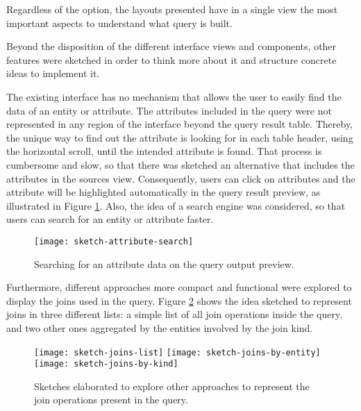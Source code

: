 Regardless of the option, the layouts presented have in a single view the most important aspects to understand what query is built.

Beyond the disposition of the different interface views and components, other features were sketched in order to think more about it and structure concrete ideas to implement it.

The existing interface has no mechanism that allows the user to easily find the data of an entity or attribute. The attributes included in the query were not represented in any region of the interface beyond the query result table. Thereby, the unique way to find out the attribute is looking for in each table header, using the horizontal scroll, until the intended attribute is found. That process is cumbersome and slow, so that there was sketched an alternative that includes the attributes in the sources view. Consequently, users can click on attributes and the attribute will be highlighted automatically in the query result preview, as illustrated in Figure \ref{fig:sketchAttributeSearch}. Also, the idea of a search engine was considered, so that users can search for an entity or attribute faster.

\begin{figure}[htbp]
	\centering
	\texttt{[image: sketch-attribute-search]}
	\caption{Searching for an attribute data on the query output preview.}
	\label{fig:sketchAttributeSearch}
\end{figure}

Furthermore, different approaches more compact and functional were explored to display the joins used in the query. Figure \ref{fig:sketchJoins} shows the idea sketched to represent joins in three different lists: a simple list of all join operations inside the query, and two other ones aggregated by the entities involved by the join kind.

\begin{figure}[tb]
  \centering
    {\texttt{[image: sketch-joins-list]}}%
  {\texttt{[image: sketch-joins-by-entity]}}%
  {\texttt{[image: sketch-joins-by-kind]}}%
\caption{Sketches elaborated to explore other approaches to represent the join operations present in the query.}
  \label{fig:sketchJoins}
\end{figure}

